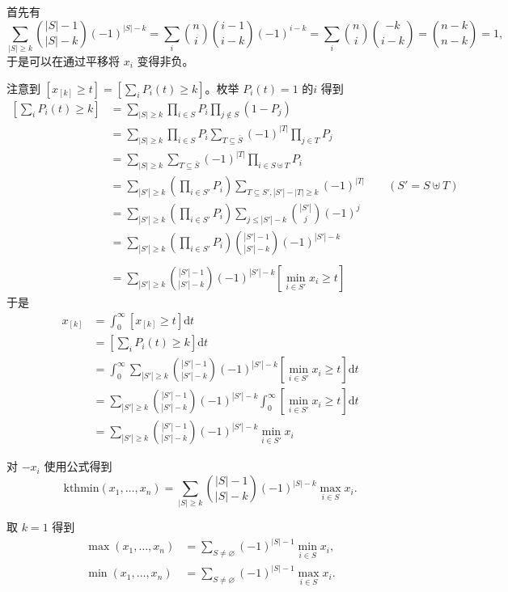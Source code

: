 \begin{solution}
    首先有
    $$
    \sum_{|S|\ge k}\binom{|S|-1}{|S|-k}(-1)^{|S|-k}=\sum_{i}\binom{n}{i}\binom{i-1}{i-k}(-1)^{i-k}=\sum_i \binom{n}{i}\binom{-k}{i-k}=\binom{n-k}{n-k}=1,
    $$
    于是可以在通过平移将 $x_i$ 变得非负。
    
    注意到 $[x_{[k]}\ge t]=\left[\sum_i P_i(t)\ge k\right]$。枚举 $P_i(t)=1$ 的$i$ 得到
    $$
    \begin{aligned}
        \left[\sum_i P_i(t)\ge k\right]&=\sum_{|S|\ge k}\prod_{i\in S}P_i\prod_{j\notin S}(1-P_j)\\
        &=\sum_{|S|\ge k}\prod_{i\in S}P_i\sum_{T\subseteq \bar S}(-1)^{|T|}\prod_{j\in T}P_j\\
        &=\sum_{|S|\ge k}\sum_{T\subseteq \bar S}(-1)^{|T|}\prod_{i\in S\uplus T}P_i\\
        &=\sum_{|S'|\ge k}\left(\prod_{i\in S'}P_i\right)\sum_{T\subseteq S',|S'|-|T|\ge k}(-1)^{|T|}\qquad(S'=S\uplus T)\\
        &=\sum_{|S'|\ge k}\left(\prod_{i\in S'}P_i\right)\sum_{j\le |S'|-k}\binom{|S'|}{j}(-1)^j\\
        &=\sum_{|S'|\ge k}\left(\prod_{i\in S'}P_i\right)\binom{|S'|-1}{|S'|-k}(-1)^{|S'|-k}\\\\
        &=\sum_{|S'|\ge k}\binom{|S'|-1}{|S'|-k}(-1)^{|S'|-k}\left[\min_{i\in S'} x_i\ge t\right]
    \end{aligned}
    $$
    于是
    $$
    \begin{aligned}
    x_{[k]}&=\int_0^\infty [x_{[k]}\ge t]\mathrm{d}t\\
    &=\left[\sum_i P_i(t)\ge k\right]\mathrm{d}t\\
    &=\int_0^{\infty}\sum_{|S'|\ge k}\binom{|S'|-1}{|S'|-k}(-1)^{|S'|-k}\left[\min_{i\in S'} x_i\ge t\right]\mathrm{d}t\\
    &=\sum_{|S'|\ge k}\binom{|S'|-1}{|S'|-k}(-1)^{|S'|-k}\int_0^{\infty}\left[\min_{i\in S'} x_i\ge t\right]\mathrm{d}t\\
    &=\sum_{|S'|\ge k}\binom{|S'|-1}{|S'|-k}(-1)^{|S'|-k}\min_{i\in S'} x_i
    \end{aligned}
    $$
\end{solution}
\begin{corollary}
    对 $-x_i$ 使用公式得到
    $$
    \mathrm{kthmin}(x_1,\ldots,x_n)=\sum_{|S|\ge k}\binom{|S|-1}{|S|-k}(-1)^{|S|-k}\max_{i\in S}x_i.
    $$

    取 $k=1$ 得到
    $$
    \begin{aligned}
    \max(x_1,\ldots,x_n)&=\sum_{S\ne \varnothing}(-1)^{|S|-1}\min_{i\in S}x_i,\\
    \min(x_1,\ldots,x_n)&=\sum_{S\ne \varnothing}(-1)^{|S|-1}\max_{i\in S}x_i.
    \end{aligned}
    $$
\end{corollary}
